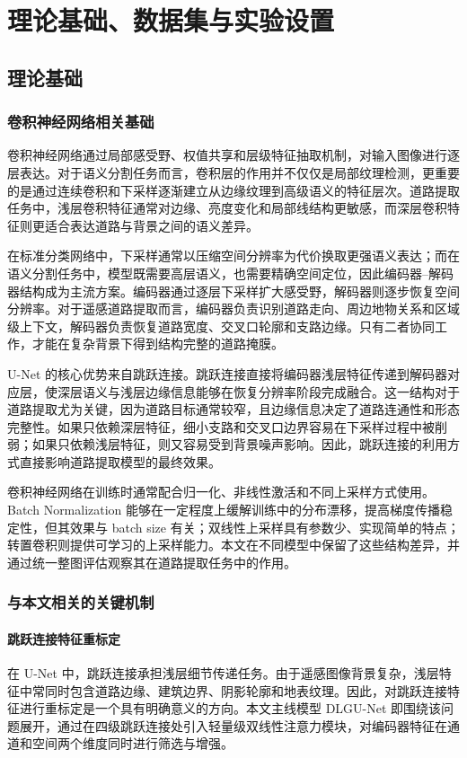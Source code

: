 
\chapter{理论基础、数据集与实验设置}
\label{cha:v2-foundation}

\section{理论基础}
\subsection{卷积神经网络相关基础}
卷积神经网络通过局部感受野、权值共享和层级特征抽取机制，对输入图像进行逐层表达。对于语义分割任务而言，卷积层的作用并不仅仅是局部纹理检测，更重要的是通过连续卷积和下采样逐渐建立从边缘纹理到高级语义的特征层次。道路提取任务中，浅层卷积特征通常对边缘、亮度变化和局部线结构更敏感，而深层卷积特征则更适合表达道路与背景之间的语义差异。

在标准分类网络中，下采样通常以压缩空间分辨率为代价换取更强语义表达；而在语义分割任务中，模型既需要高层语义，也需要精确空间定位，因此编码器--解码器结构成为主流方案。编码器通过逐层下采样扩大感受野，解码器则逐步恢复空间分辨率。对于遥感道路提取而言，编码器负责识别道路走向、周边地物关系和区域级上下文，解码器负责恢复道路宽度、交叉口轮廓和支路边缘。只有二者协同工作，才能在复杂背景下得到结构完整的道路掩膜。

U-Net 的核心优势来自跳跃连接。跳跃连接直接将编码器浅层特征传递到解码器对应层，使深层语义与浅层边缘信息能够在恢复分辨率阶段完成融合\cite{unet2015}。这一结构对于道路提取尤为关键，因为道路目标通常较窄，且边缘信息决定了道路连通性和形态完整性。如果只依赖深层特征，细小支路和交叉口边界容易在下采样过程中被削弱；如果只依赖浅层特征，则又容易受到背景噪声影响。因此，跳跃连接的利用方式直接影响道路提取模型的最终效果。

卷积神经网络在训练时通常配合归一化、非线性激活和不同上采样方式使用。Batch Normalization 能够在一定程度上缓解训练中的分布漂移，提高梯度传播稳定性，但其效果与 batch size 有关；双线性上采样具有参数少、实现简单的特点；转置卷积则提供可学习的上采样能力。本文在不同模型中保留了这些结构差异，并通过统一整图评估观察其在道路提取任务中的作用。

\subsection{与本文相关的关键机制}
\subsubsection{跳跃连接特征重标定}
在 U-Net 中，跳跃连接承担浅层细节传递任务。由于遥感图像背景复杂，浅层特征中常同时包含道路边缘、建筑边界、阴影轮廓和地表纹理。因此，对跳跃连接特征进行重标定是一个具有明确意义的方向。本文主线模型 DLGU-Net 即围绕该问题展开，通过在四级跳跃连接处引入轻量级双线性注意力模块，对编码器特征在通道和空间两个维度同时进行筛选与增强。

